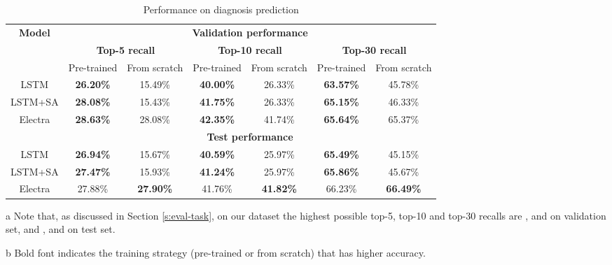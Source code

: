 \documentclass[11pt,a4paper]{article}
\begin{document}
\begin{table*}[ht]
\centering
\begin{threeparttable}
\begin{tabular}{|c|c|c|c|c|c|c|}
\hline
\multirow{2}{*}{\textbf{Model}} & \multicolumn{6}{c|}{\textbf{Validation performance}} \\ \cline{2-7} 
 & \multicolumn{2}{c|}{\textbf{Top-5 recall}} & \multicolumn{2}{c|}{\textbf{Top-10 recall}} & \multicolumn{2}{c|}{\textbf{Top-30 recall}} \\ \hline
 & Pre-trained & From scratch & Pre-trained & From scratch & Pre-trained & From scratch \\ \hline
LSTM & \textbf{26.20\%} & 15.49\% & \textbf{40.00\%} & 26.33\% & \textbf{63.57\%} & 45.78\% \\ \hline
LSTM+SA & \textbf{28.08\%} & 15.43\% & \textbf{41.75\%} & 26.33\% & \textbf{65.15\%} & 46.33\% \\ \hline
Electra & \textbf{28.63\%} & 28.08\% & \textbf{42.35\%} & 41.74\% & \textbf{65.64\%} & 65.37\% \\ \hline
& \multicolumn{6}{c|}{\textbf{Test performance}} \\ \hline
LSTM & \textbf{26.94\%} & 15.67\% & \textbf{40.59\%} & 25.97\% & \textbf{65.49\%} & 45.15\% \\ \hline
LSTM+SA & \textbf{27.47\%} & 15.93\% & \textbf{41.24\%} & 25.97\% & \textbf{65.86\%} & 45.67\% \\ \hline
Electra & 27.88\% & \textbf{27.90\%} & 41.76\% & \textbf{41.82\%} & 66.23\% & \textbf{66.49\%} \\ \hline
\end{tabular}
\caption{Performance on diagnosis prediction}
\label{tab:diag-recalls}
\begin{tablenotes}
\small
\item[a] Note that, as discussed in Section \ref{s:eval-task}, on our dataset the highest possible top-5, top-10 and top-30 recalls are ,  and  on validation set, and ,  and  on test set.
\item[b] Bold font indicates the training strategy (pre-trained or from scratch) that has higher accuracy.
\end{tablenotes}
\end{threeparttable}
\end{table*}
\end{document}
